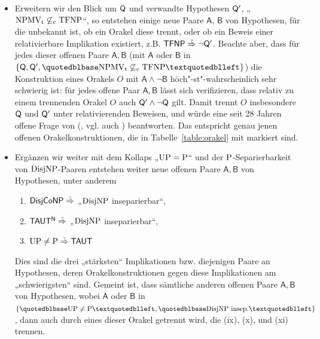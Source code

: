 \begin{itemize}[parsep=0pt,listparindent=\parindent,itemsep=5pt plus 1pt minus 1pt,midpenalty=0]
\item Erweitern wir den Blick um $\hQ$ und verwandte Hypothesen $\hQ'$, „$\NPMVt\not\subseteqc \TFNP$“, so entstehen einige neue Paare $\mathsf{A}$, $\mathsf{B}$ von Hypothesen, für die unbekannt ist, ob ein Orakel diese trennt, oder ob ein Beweis einer relativierbare Implikation existiert, z.B. $\hTFNP\stackrel{\smash{\text{\raisebox{-1pt}{\tiny ?}}}}{\Rightarrow}\neg\hQ'$. Beachte aber, dass für jedes dieser offenen Paare $\mathsf{A,B}$ (mit $\mathsf A$ oder $\mathsf B$ in $\{\hQ, \hQ', „\NPMVt\not\subseteqc \TFNP“\}$) die Konstruktion eines Orakels $O$ mit $\mathsf{A\land \neg B}$ höch"-st"-wahrscheinlich sehr schwierig ist: für jedes offene Paar $\mathsf{A,B}$ lässt sich verifizieren, dass relativ zu einem trennenden Orakel $O$ auch $\hQ'\land \neg \hQ$ gilt. Damit trennt $O$ insbesondere $\hQ$ und $\hQ'$ unter relativierenden Beweisen, und würde eine seit 28 Jahren offene Frage von \citeauthor{fenner_inverting_2003} (\citeyear{fenner_inverting_2003}, vgl. auch \citeyear{fenner_inverting_1996}) beantworten. Das entspricht genau jenen offenen Orakelkonstruktionen, die in Tabelle~\ref{table:orakel} mit \dag{} markiert sind.

    \item Ergänzen wir weiter mit dem Kollaps „$\UP=\P$“ und der $\P$-Separierbarkeit von $\DisjNP$-Paaren entstehen weiter neue offenen Paare $\mathsf{A,B}$ von Hypothesen, unter anderem
        \begin{enumerate}[noitemsep,resume,label=(\roman*)]
            \item $\hDisjCoNP\stackrel{\smash{\text{\raisebox{-1pt}{\tiny ?}}}}{\Rightarrow}$ „$\DisjNP$ inseparierbar“,
            \item $\mathsf{TAUT^N}\stackrel{\smash{\text{\raisebox{-1pt}{\tiny ?}}}}{\Rightarrow}$ „$\DisjNP$ inseparierbar“,
            \item $\UP\neq\P\stackrel{\smash{\text{\raisebox{-1pt}{\tiny ?}}}}{\Rightarrow} \hTAUT$
        \end{enumerate}
        Dies sind die drei „stärksten“ Implikationen bzw. diejenigen Paare an Hypothesen, deren Orakelkonstruktionen gegen diese Implikationen am „schwierigsten“ sind. Gemeint ist, dass sämtliche anderen offenen Paare $\mathsf{A,B}$ von Hypothesen, wobei $\mathsf{A}$ oder $\mathsf{B}$ in $\{„\UP\neq\P“, „\DisjNP\text{ insep.}“\}$, dann auch durch eines dieser Orakel getrennt wird, die (ix), (x), und (xi) trennen.


\end{itemize}
